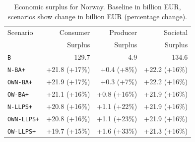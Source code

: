 \begin{table}[htbp]
\centering
\caption{Economic surplus for Norway. Baseline in billion EUR, scenarios show change in billion EUR (percentage change).}
\label{tab:surplus_norway}
\begin{tabular}{lrrr}
\toprule
Scenario & Consumer & Producer & Societal \\
 & Surplus & Surplus & Surplus \\
\midrule
\multicolumn{1}{l}{\texttt{B}} & 129.7 & 4.9 & 134.6 \\
\midrule
\texttt{N-BA+} & +21.8 (+17\%) & +0.4 (+8\%) & +22.2 (+16\%) \\
\texttt{OWN-BA+} & +21.9 (+17\%) & +0.3 (+7\%) & +22.2 (+16\%) \\
\texttt{OW-BA+} & +21.1 (+16\%) & +0.8 (+16\%) & +21.9 (+16\%) \\
\midrule
\texttt{N-LLPS+} & +20.8 (+16\%) & +1.1 (+22\%) & +21.9 (+16\%) \\
\texttt{OWN-LLPS+} & +20.8 (+16\%) & +1.1 (+23\%) & +21.9 (+16\%) \\
\texttt{OW-LLPS+} & +19.7 (+15\%) & +1.6 (+33\%) & +21.3 (+16\%) \\
\bottomrule
\end{tabular}
\end{table}
